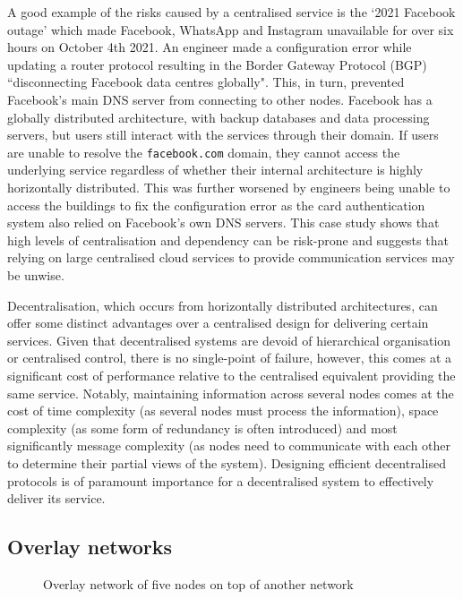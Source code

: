 A good example of the risks caused by a centralised service is the `2021 Facebook outage' which made Facebook, WhatsApp and Instagram unavailable for over six hours on October 4th 2021\cite{heath2021facebook}. An engineer made a configuration error while updating a router protocol resulting in the Border Gateway Protocol (BGP)\cite{feamster2005detecting} ``disconnecting Facebook data centres globally"\cite{janardhan2021meta}. This, in turn, prevented Facebook's main DNS server from connecting to other nodes. Facebook has a globally distributed architecture, with backup databases and data processing servers, but users still interact with the services through their domain. If users are unable to resolve the \verb+facebook.com+ domain, they cannot access the underlying service regardless of whether their internal architecture is highly horizontally distributed. This was further worsened by engineers being unable to access the buildings to fix the configuration error as the card authentication system also relied on Facebook's own DNS servers\cite{heath2021facebook}. This case study shows that high levels of centralisation and dependency can be risk-prone and suggests that relying on large centralised cloud services to provide communication services may be unwise.

Decentralisation, which occurs from horizontally distributed architectures, can offer some distinct advantages over a centralised design for delivering certain services. Given that decentralised systems are devoid of hierarchical organisation or centralised control\cite{lua2005survey}, there is no single-point of failure\cite{raval2016decentralised}, however, this comes at a significant cost of performance relative to the centralised equivalent providing the same service. Notably, maintaining information across several nodes comes at the cost of time complexity (as several nodes must process the information), space complexity (as some form of redundancy is often introduced) and most significantly message complexity (as nodes need to communicate with each other to determine their partial views of the system). Designing efficient decentralised protocols is of paramount importance for a decentralised system to effectively deliver its service.

\subsection{Overlay networks}
\label{subsec:overlayNetworks}

\begin{figure}[ht]
    \centering
    
    \caption{Overlay network of five nodes on top of another network}
    \label{fig:overlay_network}
\end{figure}

